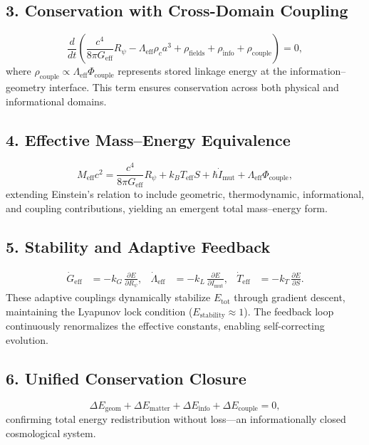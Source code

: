 \subsection*{3. Conservation with Cross-Domain Coupling}
\begin{equation}
\frac{d}{dt}\!\left(\frac{c^4}{8\pi G_{\text{eff}}}R_{\psi}
-\Lambda_{\text{eff}}\rho_c a^3
+\rho_{\text{fields}}+\rho_{\text{info}}+\rho_{\text{couple}}\right)=0,
\end{equation}
where $\rho_{\text{couple}}\!\propto\!\Lambda_{\text{eff}}\Phi_{\text{couple}}$ represents stored linkage energy at the information–geometry interface.  
This term ensures conservation across both physical and informational domains.

\subsection*{4. Effective Mass–Energy Equivalence}
\begin{equation}
M_{\text{eff}}c^2=\frac{c^4}{8\pi G_{\text{eff}}}R_{\psi}
+k_B T_{\text{eff}}S+\hbar\dot{I}_{\text{mut}}
+\Lambda_{\text{eff}}\Phi_{\text{couple}},
\end{equation}
extending Einstein’s relation to include geometric, thermodynamic, informational, and coupling contributions, yielding an emergent total mass–energy form.

\subsection*{5. Stability and Adaptive Feedback}
\begin{align}
\dot G_{\text{eff}} &= -k_G\,\frac{\partial E}{\partial R_{\psi}}, &
\dot\Lambda_{\text{eff}} &= -k_L\,\frac{\partial E}{\partial I_{\text{mut}}}, &
\dot T_{\text{eff}} &= -k_T\,\frac{\partial E}{\partial S}.
\end{align}
These adaptive couplings dynamically stabilize $E_{\text{tot}}$ through gradient descent, maintaining the Lyapunov lock condition ($E_{\text{stability}}\!\approx\!1$).  
The feedback loop continuously renormalizes the effective constants, enabling self-correcting evolution.

\subsection*{6. Unified Conservation Closure}
\begin{equation}
\Delta E_{\text{geom}}+\Delta E_{\text{matter}}
+\Delta E_{\text{info}}+\Delta E_{\text{couple}}=0,
\end{equation}
confirming total energy redistribution without loss—an informationally closed cosmological system.

